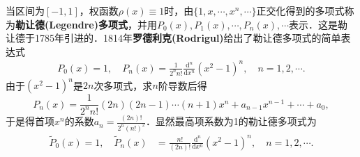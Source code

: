 \documentclass[../../main.tex]{subfiles}
\begin{document}
\begin{definition}
当区间为$[-1,1]$，权函数$\rho(x) \equiv 1$时，由$\{1,x,\cdots,x^n,\cdots\}$正交化得到的多项式称为\textbf{勒让德(Legendre)多项式}，并用$P_0(x),P_1(x),\cdots,P_n(x),\cdots$表示．这是勒让德于1785年引进的．1814年\textbf{罗德利克(Rodrigul)}给出了勒让德多项式的简单表达式
\begin{align}\label{eq:数值分析-3-2.5}
P_0(x) = 1,\quad P_n(x) = \frac{1}{2^n n!} \frac{\mathrm{d}^n}{\mathrm{d}x^n}(x^2 - 1)^n,\quad n = 1,2,\cdots.
\end{align}
由于$(x^2 - 1)^n$是$2n$次多项式，求$n$阶导数后得
$$P_n(x) = \frac{1}{2^n n!}(2n)(2n - 1)\cdots(n + 1)x^n + a_{n-1}x^{n-1} + \cdots + a_0,$$
于是得首项$x^n$的系数$a_n = \frac{(2n)!}{2^n (n!)^2}$．显然最高项系数为1的勒让德多项式为
\begin{align}\label{eq:数值分析-3-2.6}
\widetilde{P}_0(x) = 1,\quad \widetilde{P}_n(x) &= \frac{n!}{(2n)!} \frac{\mathrm{d}^n}{\mathrm{d}x^n}(x^2 - 1)^n,\quad n = 1,2,\cdots.
\end{align}
\end{definition}
\end{document}
